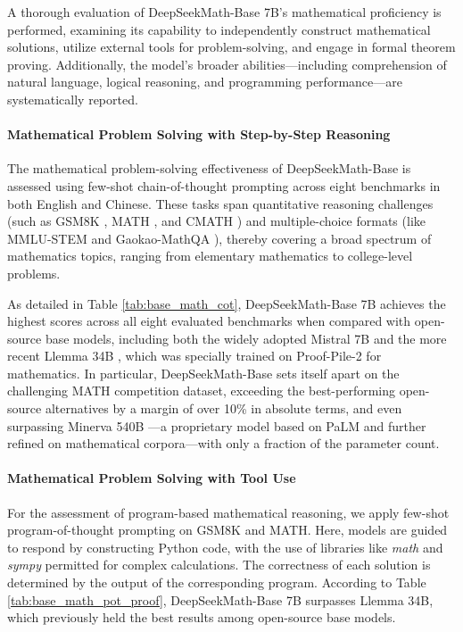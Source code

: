 A thorough evaluation of DeepSeekMath-Base 7B's mathematical proficiency is performed, examining its capability to independently construct mathematical solutions, utilize external tools for problem-solving, and engage in formal theorem proving. Additionally, the model's broader abilities—including comprehension of natural language, logical reasoning, and programming performance—are systematically reported.

\paragraph{Mathematical Problem Solving with Step-by-Step Reasoning}

The mathematical problem-solving effectiveness of DeepSeekMath-Base is assessed using few-shot chain-of-thought prompting \citep{cot} across eight benchmarks in both English and Chinese. These tasks span quantitative reasoning challenges (such as GSM8K \citep{gsm8k}, MATH \citep{MATH}, and CMATH \citep{wei2023cmath}) and multiple-choice formats (like MMLU-STEM \citep{mmlu} and Gaokao-MathQA \citep{agieval}), thereby covering a broad spectrum of mathematics topics, ranging from elementary mathematics to college-level problems.

As detailed in Table \ref{tab:base_math_cot}, DeepSeekMath-Base 7B achieves the highest scores across all eight evaluated benchmarks when compared with open-source base models, including both the widely adopted Mistral 7B \citep{mistral} and the more recent Llemma 34B \citep{llemma}, which was specially trained on Proof-Pile-2 \citep{llemma} for mathematics. In particular, DeepSeekMath-Base sets itself apart on the challenging MATH competition dataset, exceeding the best-performing open-source alternatives by a margin of over 10\% in absolute terms, and even surpassing Minerva 540B \citep{minerva}—a proprietary model based on PaLM \citep{palm} and further refined on mathematical corpora—with only a fraction of the parameter count.

\paragraph{Mathematical Problem Solving with Tool Use} For the assessment of program-based mathematical reasoning, we apply few-shot program-of-thought prompting \citep{pot,pal} on GSM8K and MATH. Here, models are guided to respond by constructing Python code, with the use of libraries like \textit{math} and \textit{sympy} permitted for complex calculations. The correctness of each solution is determined by the output of the corresponding program. According to Table \ref{tab:base_math_pot_proof}, DeepSeekMath-Base 7B surpasses Llemma 34B, which previously held the best results among open-source base models.

